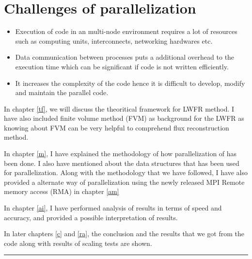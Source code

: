 \section{Challenges of parallelization}
\begin{itemize}
    \item Execution of code in an multi-node environment requires a lot of resources such as computing units, interconnects, networking hardwares etc.
    \item Data communication between processes puts a additional overhead to the execution time which can be significant if code is not written efficiently.
    \item It increases the complexity of the code hence it is difficult to develop, modify and maintain the parallel code.
\end{itemize}
In chapter \ref{tf}, we will discuss the theoritical framework for LWFR method. I have also included finite volume method (FVM) as background for the LWFR as knowing about FVM can be very helpful to comprehend flux reconstruction method.

\vspace{5pt}\hspace{-26pt}
In chapter \ref{m}, I have explained the methodology of how parallelization of  has been done. I also have mentioned about the data structures that has been used for parallelization.
Along with the methodology that we have followed, I have also provided a alternate way of parallelization using the newly released MPI Remote memory access (RMA) in chapter \ref{am}

\vspace{5pt}\hspace{-23pt}
In chapter \ref{ai}, I have performed analysis of results in terms of speed and accuracy, and provided a possible interpretation of results.

\vspace{5pt}\hspace{-23pt}
In later chapters \ref{c} and \ref{ra}, the conclusion and the results that we got from the code along with results of scaling tests are shown.

\begin{center}
    \rule{3cm}{1pt}
\end{center}
